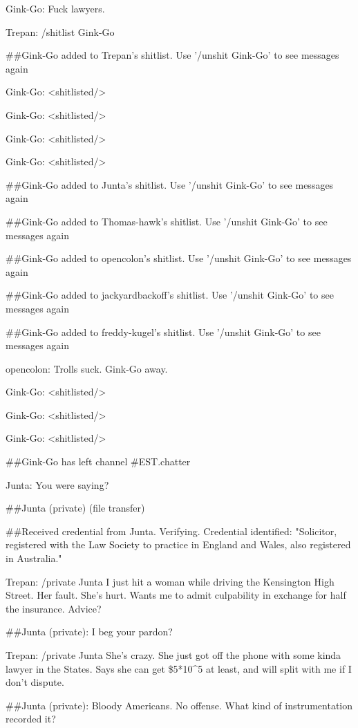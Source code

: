 Gink-Go: Fuck lawyers.

Trepan: /shitlist Gink-Go

\#\#Gink-Go added to Trepan's shitlist. Use '/unshit Gink-Go' to
see messages again

Gink-Go: \textless{}shitlisted/\textgreater{}

Gink-Go: \textless{}shitlisted/\textgreater{}

Gink-Go: \textless{}shitlisted/\textgreater{}

Gink-Go: \textless{}shitlisted/\textgreater{}

\#\#Gink-Go added to Junta's shitlist. Use '/unshit Gink-Go' to see
messages again

\#\#Gink-Go added to Thomas-hawk's shitlist. Use '/unshit Gink-Go'
to see messages again

\#\#Gink-Go added to opencolon's shitlist. Use '/unshit Gink-Go' to
see messages again

\#\#Gink-Go added to jackyardbackoff's shitlist. Use '/unshit
Gink-Go' to see messages again

\#\#Gink-Go added to freddy-kugel's shitlist. Use '/unshit Gink-Go'
to see messages again

opencolon: Trolls suck. Gink-Go away.

Gink-Go: \textless{}shitlisted/\textgreater{}

Gink-Go: \textless{}shitlisted/\textgreater{}

Gink-Go: \textless{}shitlisted/\textgreater{}

\#\#Gink-Go has left channel \#EST.chatter

Junta: You were saying?

\#\#Junta (private) (file transfer)

\#\#Received credential from Junta. Verifying. Credential
identified: "Solicitor, registered with the Law Society to practice
in England and Wales, also registered in Australia."

Trepan: /private Junta I just hit a woman while driving the
Kensington High Street. Her fault. She's hurt. Wants me to admit
culpability in exchange for half the insurance. Advice?

\#\#Junta (private): I beg your pardon?

Trepan: /private Junta She's crazy. She just got off the phone with
some kinda lawyer in the States. Says she can get \$5*10\^{}5 at
least, and will split with me if I don't dispute.

\#\#Junta (private): Bloody Americans. No offense. What kind of
instrumentation recorded it?

